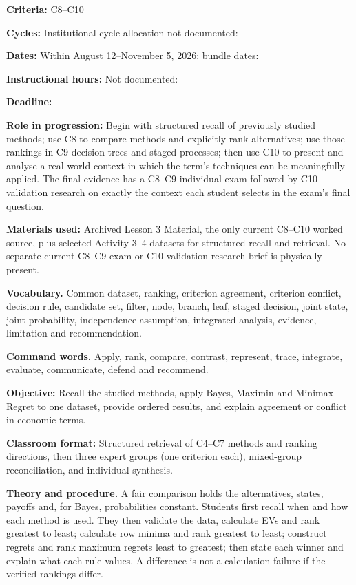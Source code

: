 \documentclass[10pt,letterpaper]{article}
\newcommand{\labelled}[2]{\textbf{#1:} #2\par}
\newcommand{\partheading}[1]{\Needspace{7\baselineskip}\par\vspace{4pt}{\bfseries #1\par}}
\begin{document}
\labelled{Criteria}{C8--C10}
\labelled{Cycles}{Institutional cycle allocation not documented: \underline{\hspace{2.2in}}}
\labelled{Dates}{Within August 12--November 5, 2026; bundle dates: \underline{\hspace{2.1in}}}
\labelled{Instructional hours}{Not documented: \underline{\hspace{1.6in}}}
\labelled{Deadline}{\underline{\hspace{3in}}}
\labelled{Role in progression}{Begin with structured recall of previously studied methods; use C8 to compare methods and explicitly rank alternatives; use those rankings in C9 decision trees and staged processes; then use C10 to present and analyse a real-world context in which the term's techniques can be meaningfully applied. The final evidence has a C8--C9 individual exam followed by C10 validation research on exactly the context each student selects in the exam's final question.}
\labelled{Materials used}{Archived Lesson 3 Material, the only current C8--C10 worked source, plus selected Activity 3--4 datasets for structured recall and retrieval. No separate current C8--C9 exam or C10 validation-research brief is physically present.}

\textbf{Vocabulary.} Common dataset, ranking, criterion agreement,
criterion conflict, decision rule, candidate set, filter, node, branch, leaf,
staged decision, joint state, joint probability, independence assumption,
integrated analysis, evidence, limitation and recommendation.

\textbf{Command words.} Apply, rank, compare, contrast, represent, trace,
integrate, evaluate, communicate, defend and recommend.

\partheading{Part 1---Structured Recall and C8: Compare Methods and Rank Alternatives}
\labelled{Objective}{Recall the studied methods, apply Bayes, Maximin and Minimax Regret to one dataset, provide ordered results, and explain agreement or conflict in economic terms.}
\labelled{Classroom format}{Structured retrieval of C4--C7 methods and ranking directions, then three expert groups (one criterion each), mixed-group reconciliation, and individual synthesis.}
\textbf{Theory and procedure.} A fair comparison holds the alternatives,
states, payoffs and, for Bayes, probabilities constant. Students first recall
when and how each method is used. They then validate the data, calculate EVs
and rank greatest to least; calculate row minima and rank greatest to least;
construct regrets and rank maximum regrets least to greatest; then state each
winner and explain what each rule values. A difference is not a calculation
failure if the verified rankings differ.
\end{document}
